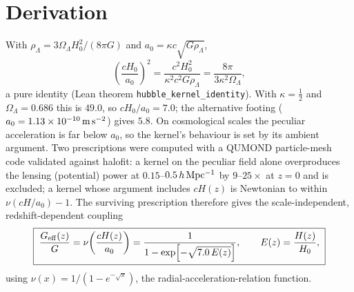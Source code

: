 \documentclass[11pt,letterpaper]{article}
\begin{document}
\section{Derivation}
With $\rho_\Lambda=3\Omega_\Lambda H_0^2/(8\pi G)$ and $a_0=\kappa c\sqrt{G\rho_\Lambda}$,
\begin{equation}
\left(\frac{cH_0}{a_0}\right)^2=\frac{c^2H_0^2}{\kappa^2c^2G\rho_\Lambda}=\frac{8\pi}{3\kappa^2\Omega_\Lambda},
\end{equation}
a pure identity (Lean theorem \texttt{hubble\_kernel\_identity}). With $\kappa=\tfrac12$ and $\Omega_\Lambda=0.686$ this is $49.0$, so $cH_0/a_0=7.0$; the alternative footing ($a_0=1.13\times10^{-10}\,{\rm m\,s^{-2}}$) gives $5.8$. On cosmological scales the peculiar acceleration is far below $a_0$, so the kernel's behaviour is set by its ambient argument. Two prescriptions were computed with a QUMOND particle-mesh code validated against halofit: a kernel on the peculiar field alone overproduces the lensing (potential) power at $0.15$--$0.5\,h\,{\rm Mpc^{-1}}$ by $9$--$25\times$ at $z=0$ and is excluded; a kernel whose argument includes $cH(z)$ is Newtonian to within $\nu(cH/a_0)-1$. The surviving prescription therefore gives the scale-independent, redshift-dependent coupling
\begin{equation}
\boxed{\;\frac{G_{\rm eff}(z)}{G}=\nu\!\left(\frac{cH(z)}{a_0}\right)=\frac{1}{1-\exp\!\left[-\sqrt{7.0\,E(z)}\right]},\qquad E(z)=\frac{H(z)}{H_0},\;}
\end{equation}
using $\nu(x)=1/(1-e^{-\sqrt{x}})$, the radial-acceleration-relation function.
\end{document}
